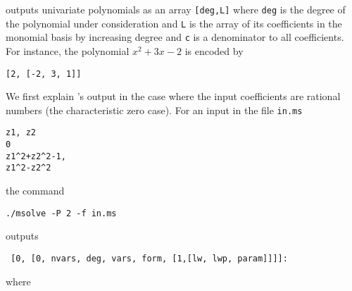 \documentclass[a4paper,english,11pt]{scrartcl}
\theoremstyle{definition}
\theoremstyle{remark}
\begin{document}
\msolve outputs univariate polynomials as an array \verb+[deg,L]+ where
\verb+deg+ is the degree of the polynomial under consideration and \verb+L+ is
the array of its coefficients in the monomial basis by increasing degree and 
\verb+c+ is a denominator to all coefficients. For instance, the polynomial 
\(x^2+3x-2\) is encoded by 
\begin{verbatim}
[2, [-2, 3, 1]]
\end{verbatim}


We first explain \msolve's output in the case where the input coefficients are 
rational numbers (the characteristic zero case).
For an input in the file \verb+in.ms+
\begin{tcolorbox}
\begin{verbatim}
z1, z2
0
z1^2+z2^2-1,
z1^2-z2^2
\end{verbatim}
\end{tcolorbox}
the command
\begin{tcolorbox}
\begin{verbatim}
./msolve -P 2 -f in.ms
\end{verbatim}
\end{tcolorbox}
\msolve outputs
\begin{verbatim}
 [0, [0, nvars, deg, vars, form, [1,[lw, lwp, param]]]]:
\end{verbatim}
where
\end{document}
